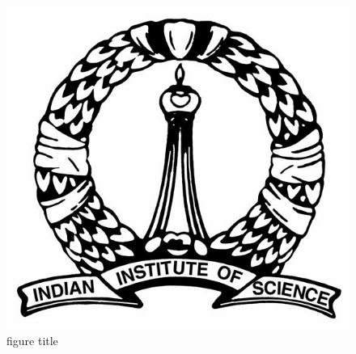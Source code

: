\documentclass[10pt,a4paper]{article}
\begin{document}
\begin{figure}
\centering
\includegraphics[angle=63]{IISc_logo.jpg}
\caption{figure title}  %
\label{reference4}        %

\end{figure}
\end{document}
